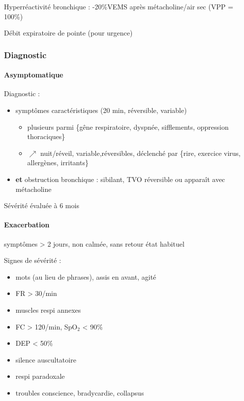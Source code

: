 \documentclass[11pt]{article}
\begin{document}
Hyperréactivité bronchique : -20\%VEMS après métacholine/air sec (VPP = 100\%)

Débit expiratoire de pointe (pour urgence)

\subsubsection{Diagnostic}
\label{sec:org123ffc8}
\paragraph{Asymptomatique}
\label{sec:org2d13a2a}
Diagnostic :

\begin{itemize}
\item symptômes caractéristiques (20 min, réversible, variable)

\begin{itemize}
\item plusieurs parmi \{gêne respiratoire, dyspnée,
sifflements, oppression thoraciques\}
\item \(\nearrow\) nuit/réveil, variable,réversibles, déclenché par \{rire, exercice
virus, allergènes, irritants\}
\end{itemize}

\item \textbf{et} obstruction bronchique : sibilant, TVO réversible ou apparaît avec métacholine
\end{itemize}

Sévérité évaluée à 6 mois
\paragraph{Exacerbation}
\label{sec:org212087d}
\nearrow{} symptômes > 2 jours, non calmée, sans retour état habituel

Signes de sévérité :

\begin{itemize}
\item mots (au lieu de phrases), assis en avant, agité
\item FR > 30/min
\item muscles respi annexes
\item FC > 120/min, SpO\(_{\text{2}}\) < 90\%
\item DEP < 50\%
\item silence auscultatoire \faBomb
\item respi paradoxale \faBomb
\item troubles conscience, bradycardie, collapsus \faBomb
\end{itemize}
\end{document}
